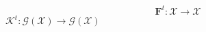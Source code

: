 \documentclass[varwidth, border=5pt]{standalone}
\begin{document}
\[
\textbf{F}^t: \mathcal{X}\to\mathcal{X}
\]
$\mathcal{K}^{t}\colon{\mathcal{G}}(\mathcal{X})\to\mathcal{G}(\mathcal{X})$
\end{document}
